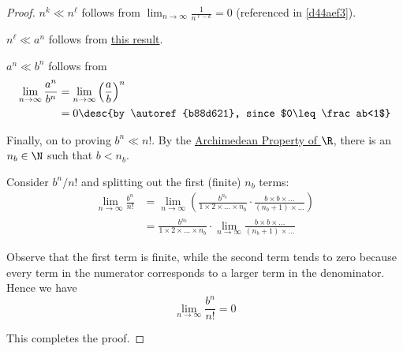 \begin{proof}
  $n^k\ll n^\ell$ follows from
  $\displaystyle\lim_{n\to\infty}\frac1{n^{\ell-k}}=0$ (referenced in
  \autoref{d44aef3}).

  $n^\ell\ll a^n$ follows from \href{cf2b74d}{this result}.

  $a^n\ll b^n$ follows from
  \begin{align*}
    \lim_{n\to\infty}\frac{a^n}{b^n}
     &=\lim_{n\to\infty}\left(\frac{a}{b}\right)^n           \\
     &=0\desc{by \autoref{b88d621}, since $0\leq\frac ab<1$}
  \end{align*}

  Finally, on to proving $b^n\ll n!$. By the \href{fbc2289}{Archimedean
  Property of $\R$}, there is an $n_b\in\N$ such that $b<n_b$.

  Consider $b^n/n!$ and splitting out the first (finite) $n_b$ terms:
  \begin{align*}
    \lim_{n\to\infty}\frac{b^n}{n!}
     &=\lim_{n\to\infty}\left(\frac{b^{n_b}}{1\times2\times\ldots\times n_b}
    \cdot\frac{b\times b\times\ldots}{(n_b+1)\times\ldots}\right)            \\
     &=\frac{b^{n_b}}{1\times2\times\ldots\times n_b}
    \cdot\lim_{n\to\infty}\frac{b\times b\times\ldots}{(n_b+1)\times\ldots}
  \end{align*}

  Observe that the first term is finite, while the second term tends to zero
  because every term in the numerator corresponds to a larger term in the
  denominator. Hence we have
  $$
    \lim_{n\to\infty}\frac{b^n}{n!}=0
  $$

  This completes the proof.
\end{proof}
